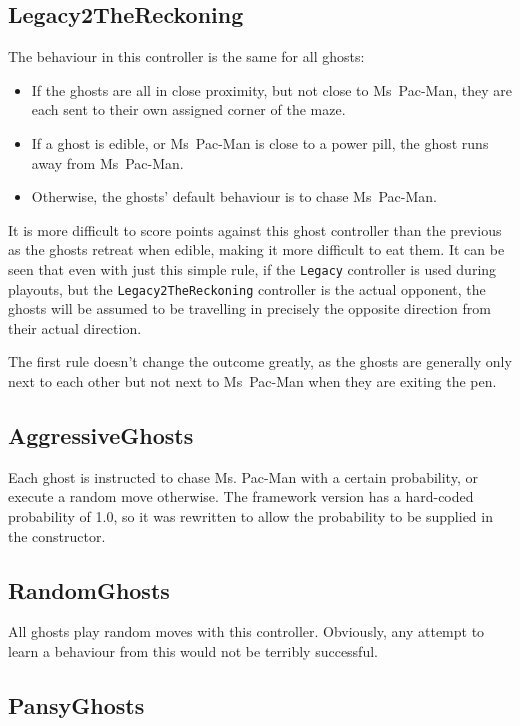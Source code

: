 \subsection{Legacy2TheReckoning}

The behaviour in this controller is the same for all ghosts:

\begin{itemize}
\item If the ghosts are all in close proximity, but not close to Ms~Pac-Man, they are each sent to their own assigned corner of the maze.
\item If a ghost is edible, or Ms~Pac-Man is close to a power pill, the ghost runs away from Ms~Pac-Man.
\item Otherwise, the ghosts' default behaviour is to chase Ms~Pac-Man.
\end{itemize}

It is more difficult to score points against this ghost controller than the previous as the ghosts retreat when edible, making it more difficult to eat them.  It can be seen that even with just this simple rule, if the {\tt Legacy} controller is used during playouts, but the {\tt Legacy2TheReckoning} controller is the actual opponent, the ghosts will be assumed to be travelling in precisely the opposite direction from their actual direction.

The first rule doesn't change the outcome greatly, as the ghosts are generally only next to each other but not next to Ms~Pac-Man when they are exiting the pen.

\subsection{AggressiveGhosts}

Each ghost is instructed to chase Ms. Pac-Man with a certain probability, or execute a random move otherwise.  The framework version has a hard-coded probability of 1.0, so it was rewritten to allow the probability to be supplied in the constructor.

\subsection{RandomGhosts}

All ghosts play random moves with this controller.  Obviously, any attempt to learn a behaviour from this would not be terribly successful.

\subsection{PansyGhosts}


